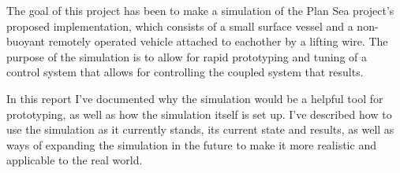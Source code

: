 The goal of this project has been to make a simulation of the Plan Sea project's proposed implementation, which consists of a small surface vessel and a non-buoyant remotely operated vehicle attached to eachother by a lifting wire. The purpose of the simulation is to allow for rapid prototyping and tuning of a control system that allows for controlling the coupled system that results. 

In this report I've documented why the simulation would be a helpful tool for prototyping, as well as how the simulation itself is set up. I've described how to use the simulation as it currently stands, its current state and results, as well as ways of expanding the simulation in the future to make it more realistic and applicable to the real world. 